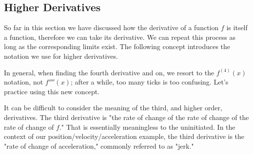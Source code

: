 \newpage

\vspace*{-.75cm}



\subsection*{Higher Derivatives}
So far in this section we have discussed how the derivative of a function $f$ is itself a function, therefore we can take its derivative. We can repeat this process as long as the corresponding limits exist. The following concept introduces the notation we use for higher derivatives. 


In general, when finding the fourth derivative and on, we resort to the $f^{(4)}(x)$ notation, not $f''''(x)$; after a while, too many ticks is too confusing. Let's practice using this new concept.


It can be difficult to consider the meaning of the third, and higher order, derivatives. The third derivative is "the rate of change of the rate of change of the rate of change of $f$." That is essentially meaningless to the uninitiated. In the context of our position/velocity/acceleration example, the third derivative is the "rate of change of acceleration," commonly referred to as "jerk." 

